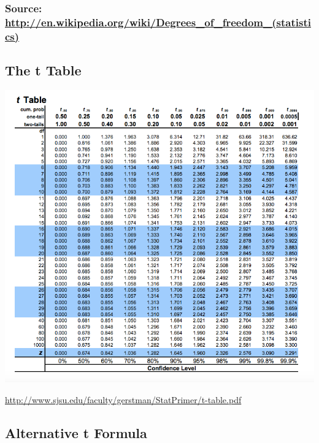 \documentclass[]{article}
\begin{document}
\subsubsection{Source:
\url{http://en.wikipedia.org/wiki/Degrees_of_freedom_(statistics)}}\label{source-httpen.wikipedia.orgwikidegreesux5fofux5ffreedomux5fstatistics}

\subsection{The t Table}\label{the-t-table}

\includegraphics{t_table1z.png}

\url{http://www.sjsu.edu/faculty/gerstman/StatPrimer/t-table.pdf}

\subsection{Alternative t Formula}\label{alternative-t-formula}
\end{document}
